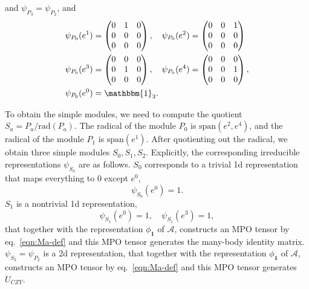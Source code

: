 \documentclass[prx, twocolumn, superscriptaddress, dvipsnames]{revtex4-2}
\theoremstyle{definition}
\newcommand{\bo}{\mathbbm{1}}
\newcommand{\mA}{\mathcal{A}}
\begin{document}
and $\psi_{P_3}=\psi_{P_2}$, and
\begin{equation}
\begin{aligned}
    &\psi_{P_0}(e^1) = \begin{pmatrix}
       0& 1 & 0\\
       0& 0 & 0\\
       0 & 0 & 0
    \end{pmatrix},\quad \psi_{P_0}(e^2) = \begin{pmatrix}
        0 &0 & 1\\
        0 & 0& 0\\
        0 & 0 & 0
    \end{pmatrix}\\
    &\psi_{P_0}(e^3) = \begin{pmatrix}
        0 & 0 & 0\\
        0 & 1 & 0\\
        0 & 0 & 0
    \end{pmatrix},\quad \psi_{P_0}(e^4) = \begin{pmatrix}
       0 & 0 & 0\\
       0& 0 & 1\\
       0 & 0 & 0
    \end{pmatrix},\\
    &\psi_{P_0}(e^0)=\bo_3.
\end{aligned}
\end{equation}

To obtain the simple modules, we need to compute the quotient $S_a=P_a/\mathrm{rad}(P_a)$. 
The radical of the module $P_0$ is $\text{span}(e^2,e^4)$, and the radical of the module $P_1$ is $\text{span}(e^1)$. 
After quotienting out the radical, we obtain three simple modules $S_0,S_1,S_2$. Explicitly, the corresponding irreducible representations $\psi_{S_a}$ are as follows. $S_0$ corresponds to a trivial 1d representation that maps everything to 0 except $e^0$,
\begin{equation}
    \psi_{S_0}(e^0) = 1.
\end{equation}
$S_1$ is a nontrivial 1d representation,
\begin{equation}
    \psi_{S_1}(e^0) = 1,\quad \psi_{S_1}(e^3) = 1,
\end{equation}
that together with the representation $\phi_\mathbf{1}$ of $\mA$, constructs an MPO tensor by eq.~\eqref{eqn:Ma-def} and this MPO tensor generates the many-body identity matrix. $\psi_{S_2}=\psi_{P_2}$ is a 2d representation, that together with the representation $\phi_\mathbf{1}$ of $\mA$, constructs an MPO tensor by eq.~\eqref{eqn:Ma-def} and this MPO tensor generates $U_{CZY}$. 
\end{document}
